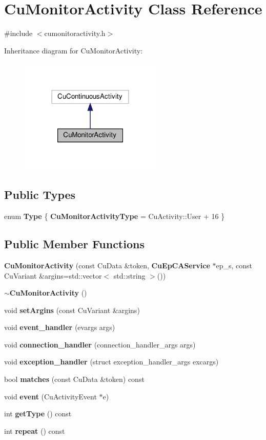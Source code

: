 \section{Cu\+Monitor\+Activity Class Reference}
\label{classCuMonitorActivity}


{\ttfamily \#include $<$cumonitoractivity.\+h$>$}



Inheritance diagram for Cu\+Monitor\+Activity\+:\nopagebreak
\begin{figure}[H]
\begin{center}
\leavevmode
\includegraphics[width=192pt]{classCuMonitorActivity__inherit__graph}
\end{center}
\end{figure}
\subsection*{Public Types}
\begin{DoxyCompactItemize}
\item 
enum \textbf{ Type} \{ \textbf{ Cu\+Monitor\+Activity\+Type} = Cu\+Activity\+:\+:User + 16
 \}
\end{DoxyCompactItemize}
\subsection*{Public Member Functions}
\begin{DoxyCompactItemize}
\item 
\textbf{ Cu\+Monitor\+Activity} (const Cu\+Data \&token, \textbf{ Cu\+Ep\+C\+A\+Service} $\ast$ep\+\_\+s, const Cu\+Variant \&argins=std\+::vector$<$ std\+::string $>$())
\item 
\textbf{ $\sim$\+Cu\+Monitor\+Activity} ()
\item 
void \textbf{ set\+Argins} (const Cu\+Variant \&argins)
\item 
void \textbf{ event\+\_\+handler} (evargs args)
\item 
void \textbf{ connection\+\_\+handler} (connection\+\_\+handler\+\_\+args args)
\item 
void \textbf{ exception\+\_\+handler} (struct exception\+\_\+handler\+\_\+args excargs)
\item 
bool \textbf{ matches} (const Cu\+Data \&token) const
\item 
void \textbf{ event} (Cu\+Activity\+Event $\ast$e)
\item 
int \textbf{ get\+Type} () const
\item 
int \textbf{ repeat} () const
\end{DoxyCompactItemize}
